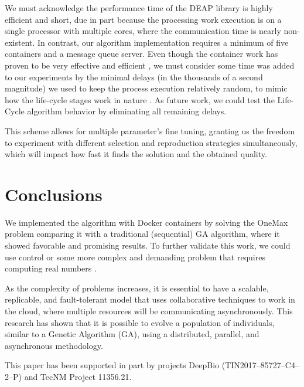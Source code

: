 \documentclass[graybox]{svmult}
\begin{document}
We must acknowledge the performance time of the DEAP library
\cite{fortin2012deap} is highly efficient and short, due in part because the
processing work execution is on a single processor with multiple cores, where
the communication time is nearly non-existent. In contrast, our algorithm
implementation requires a minimum of five containers and a message queue
server. Even though the container work has proven to be very effective and
efficient \cite{merelo2016performance,valdez2021container}, we must consider
some time was added to our experiments by the minimal delays (in the thousands
of a second magnitude) we used to keep the process execution relatively random,
to mimic how the life-cycle stages work in nature \cite{read1968system}. As
future work, we could test the Life-Cycle algorithm behavior by eliminating all
remaining delays.

This scheme allows for multiple parameter's fine tuning, granting us the
freedom to experiment with different selection and reproduction strategies
simultaneously, which will impact how fast it finds the solution and the
obtained quality.


\section{Conclusions}
\label{section.conclusions}

We implemented the algorithm with Docker containers by solving the OneMax
problem comparing it with a traditional (sequential) GA algorithm, where it
showed favorable and promising results. To further validate this work, we could
use control or some more complex and demanding problem that requires computing
real numbers \cite{stanley2002evolving,miikkulainen2019evolving}.

As the complexity of problems increases, it is essential to have a scalable,
replicable, and fault-tolerant model that uses collaborative techniques to work
in the cloud, where multiple resources will be communicating asynchronously.
This research has shown that it is possible to evolve a population of
individuals, similar to a Genetic Algorithm (GA), using a distributed,
parallel, and asynchronous methodology.

\begin{acknowledgement}
    This paper has been supported in part by projects DeepBio (TIN2017--85727--C4--2--P) and TecNM Project 11356.21\@.
\end{acknowledgement}

%


\end{document}
